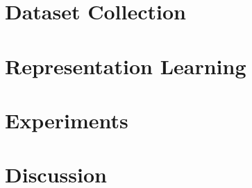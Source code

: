 




\section{Dataset Collection}
\section{Representation Learning}
\section{Experiments}
\section{Discussion}


\noindent 

%
%
%
%

